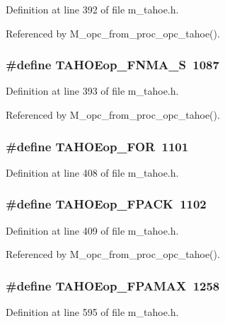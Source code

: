 Definition at line 392 of file m\_\-tahoe.h.

Referenced by M\_\-opc\_\-from\_\-proc\_\-opc\_\-tahoe().
\subsubsection{\setlength{\rightskip}{0pt plus 5cm}\#define TAHOEop\_\-FNMA\_\-S~1087}\label{m__tahoe_8h_ab3d4de6ddc242d5862b087f6963b958}




Definition at line 393 of file m\_\-tahoe.h.

Referenced by M\_\-opc\_\-from\_\-proc\_\-opc\_\-tahoe().
\subsubsection{\setlength{\rightskip}{0pt plus 5cm}\#define TAHOEop\_\-FOR~1101}\label{m__tahoe_8h_a9db146116f486751268cac3f0702a21}




Definition at line 408 of file m\_\-tahoe.h.
\subsubsection{\setlength{\rightskip}{0pt plus 5cm}\#define TAHOEop\_\-FPACK~1102}\label{m__tahoe_8h_c0d0cef32c35af3fedf8fc17908779b6}




Definition at line 409 of file m\_\-tahoe.h.

Referenced by M\_\-opc\_\-from\_\-proc\_\-opc\_\-tahoe().
\subsubsection{\setlength{\rightskip}{0pt plus 5cm}\#define TAHOEop\_\-FPAMAX~1258}\label{m__tahoe_8h_b643d4cfa116b6749d68a09ad08cb21b}




Definition at line 595 of file m\_\-tahoe.h.

